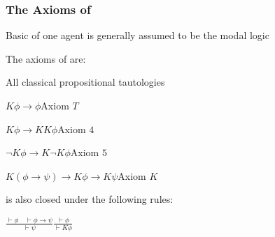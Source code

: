 \begin{frame}[allowframebreaks]
\frametitle{The Axioms of }
\begin{itemizedot}
  \item Basic  of one agent is generally assumed to be the modal
  logic 
  
  \item The axioms of  are:
  \begin{itemizedot}
    \item All classical propositional tautologies
    
    \item $K \phi \rightarrow \phi${\hspace*{\fill}}Axiom $T$
    
    
    \item $K \phi \rightarrow K K \phi${\hspace*{\fill}}Axiom $4$
    
    
    \item $\neg K \phi \rightarrow K \neg K \phi${\hspace*{\fill}}Axiom $5$
    
    
    \item $K (\phi \rightarrow \psi) \rightarrow K \phi \rightarrow K
    \psi${\hspace*{\fill}}Axiom $K$
    
  \end{itemizedot}
\end{itemizedot}
\framebreak
\begin{itemizedot}
  \item {} is also closed under the following rules:
  
  {\hspace*{\fill}}$\displaystyle \frac{\vdash \phi \hspace{1em} \vdash \phi \rightarrow
  \psi}{\vdash \psi}${\hspace*{\fill}}$\displaystyle \frac{\vdash \phi}{\vdash K
  \phi}${\hspace*{\fill}} \\
\end{itemizedot}
\end{frame}
